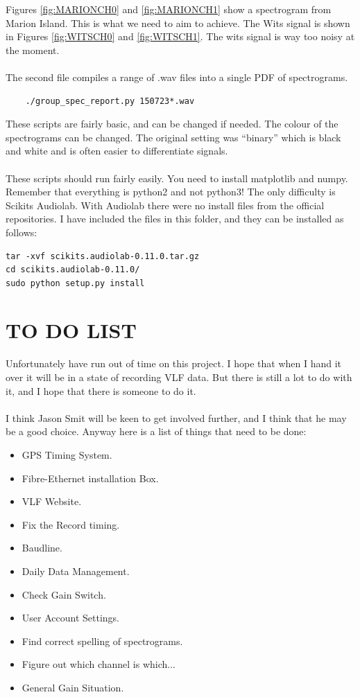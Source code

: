 \documentclass[a4paper,12pt]{article}
\begin{document}
Figures \ref{fig:MARIONCH0} and \ref{fig:MARIONCH1} show a spectrogram from Marion Island. This is what we need to aim to achieve. The Wits signal is shown in Figures \ref{fig:WITSCH0} and \ref{fig:WITSCH1}. The wits signal is way too noisy at the moment.\\
\\
The second file compiles a range of .wav files into a single PDF of spectrograms.

\begin{verbatim}
	./group_spec_report.py 150723*.wav 
\end{verbatim}

These scripts are fairly basic, and can be changed if needed. The colour of the spectrograms can be changed. The original setting was ``binary'' which is black and white and is often easier to differentiate signals.\\
\\
These scripts should run fairly easily. You need to install matplotlib and numpy. Remember that everything is python2 and not python3! The only difficulty is Scikits Audiolab. With Audiolab there were no install files from the official repositories. I have included the files in this folder, and they can be installed as follows:

\begin{verbatim}
tar -xvf scikits.audiolab-0.11.0.tar.gz
cd scikits.audiolab-0.11.0/
sudo python setup.py install
\end{verbatim}


\newpage
\section{TO DO LIST}
Unfortunately  have run out of time on this project. I hope that when I hand it over it will be in a state of recording VLF data. But there is still a lot to do with it, and I hope that there is someone to do it.\\
\\
I think Jason Smit will be keen to get involved further, and I think that he may be a good choice. Anyway here is a list of things that need to be done:

\begin{itemize}
	\item GPS Timing System.
	\item Fibre-Ethernet installation Box.
	\item VLF Website.
	\item Fix the Record timing.
	\item Baudline.
	\item Daily Data Management.
	\item Check Gain Switch.
	\item User Account Settings.
	\item Find correct spelling of spectrograms.
	\item Figure out which channel is which...
	\item General Gain Situation.
\end{itemize}
\end{document}
